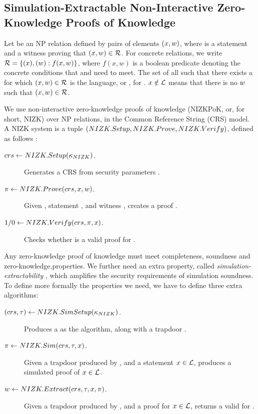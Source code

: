 \subsection{Simulation-Extractable Non-Interactive Zero-Knowledge
  Proofs of Knowledge}
\label{sapp:nizk}

Let \NIZKRel be an NP relation defined by pairs of elements $(x,w)$,
where \NIZKx is a statement and \NIZKw a witness proving that $(x,w)
\in \mathcal{R}$. For concrete relations, we write $\mathcal{R} = \lbrace (x),
(w): f(x,w) \rbrace$, where $f(x,w)$ is a boolean predicate denoting the
concrete conditions that \NIZKx and \NIZKw need to meet. The set of all \NIZKx
such that there exists a \NIZKw for which $(x,w) \in \mathcal{R}$ is the
language, or \NIZKLang, for \NIZKRel. $x \notin \mathcal{L}$ means that
there is no $w$ such that $(x,w) \in \mathcal{R}$.

We use non-interactive zero-knowledge proofs of knowledge (NIZKPoK, or, for
short, NIZK) over NP relations, in the Common Reference String (CRS) model. A
NIZK system is a tuple $(NIZK.Setup,NIZK.Prove,NIZK.Verify)$, defined as follows
\cite{gos06}:

\begin{description}
\item[$crs \gets NIZK.Setup(\kappa_{NIZK})$.] Generates a CRS \NIZKcrs from
  security parameters \NIZKsecpar.
\item[$\pi \gets NIZK.Prove(crs,x,w)$.] Given \NIZKcrs,
  statement \NIZKx, and witness \NIZKw, creates a proof \NIZKproof.
\item[$1/0 \gets NIZK.Verify(crs,\pi,x)$.] Checks whether
  \NIZKproof is a valid proof for \NIZKx.
\end{description}

Any zero-knowledge proof of knowledge must meet completeness, soundness and
zero-knowledge,properties. We further need an extra property, called
\emph{simulation-extractability} \cite{cl06}, which amplifies the security
requirements of simulation soundness.
%
To define more formally the properties we need, we have to define three extra
algorithms:

\begin{description}
\item[$(crs,\tau) \gets NIZK.SimSetup(\kappa_{NIZK})$.] Produces a
  \NIZKcrs as the \NIZKSetup algorithm, along with a trapdoor \NIZKtrap.
\item[$\pi \gets NIZK.Sim(crs,\tau,x)$.] Given a trapdoor
  \NIZKtrap produced by \NIZKSimSetup, and a statement $x \in \mathcal{L}$,
  produces a simulated proof \NIZKproof of $x \in \mathcal{L}$.
\item[$w \gets NIZK.Extract(crs,\tau,x,\pi)$.] Given
  a trapdoor \NIZKtrap produced by \NIZKSimSetup, and a proof \NIZKproof for
  $x \in \mathcal{L}$, returns a valid \NIZKw for \NIZKx.
\end{description}

